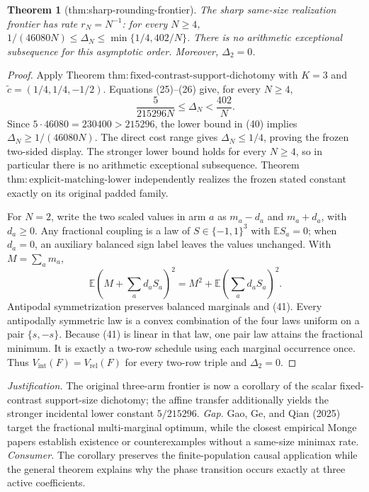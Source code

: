 \documentclass{article}
\newtheorem{theorem}{Theorem}
\begin{document}
\begin{theorem}[thm:sharp-rounding-frontier]\label{thm:sharp-rounding-frontier}
The sharp same-size realization frontier has rate \(r_N=N^{-1}\): for every \(N\ge4\), \(1/(46080N)\le\Delta_N\le\min\{1/4,402/N\}\).  There is no arithmetic exceptional subsequence for this asymptotic order.  Moreover, \(\Delta_2=0\).
\end{theorem}
\begin{proof}
Apply Theorem \(\mathrm{thm{:}fixed\mbox{-}contrast\mbox{-}support\mbox{-}dichotomy}\) with \(K=3\) and \(\widetilde c=(1/4,1/4,-1/2)\).  Equations (25)--(26) give, for every \(N\ge4\),
\[
 \frac{5}{215296N}\le\Delta_N<\frac{402}{N}. \tag{40}
\]
Since \(5\cdot46080=230400>215296\), the lower bound in (40) implies \(\Delta_N\ge1/(46080N)\).  The direct cost range gives \(\Delta_N\le1/4\), proving the frozen two-sided display.  The stronger lower bound holds for every \(N\ge4\), so in particular there is no arithmetic exceptional subsequence.  Theorem \(\mathrm{thm{:}explicit\mbox{-}matching\mbox{-}lower}\) independently realizes the frozen stated constant exactly on its original padded family.

For \(N=2\), write the two scaled values in arm \(a\) as \(m_a-d_a\) and \(m_a+d_a\), with \(d_a\ge0\).  Any fractional coupling is a law of \(S\in\{-1,1\}^3\) with \(\mathbb ES_a=0\); when \(d_a=0\), an auxiliary balanced sign label leaves the values unchanged.  With \(M=\sum_am_a\),
\[
 \mathbb E\left(M+\sum_ad_aS_a\right)^2
 =M^2+\mathbb E\left(\sum_ad_aS_a\right)^2. \tag{41}
\]
Antipodal symmetrization preserves balanced marginals and (41).  Every antipodally symmetric law is a convex combination of the four laws uniform on a pair \(\{s,-s\}\).  Because (41) is linear in that law, one pair law attains the fractional minimum.  It is exactly a two-row schedule using each marginal occurrence once.  Thus \(V_{\mathrm{int}}(F)=V_{\mathrm{rel}}(F)\) for every two-row triple and \(\Delta_2=0\).
\end{proof}
\par\smallskip\noindent \textit{Justification.} The original three-arm frontier is now a corollary of the scalar fixed-contrast support-size dichotomy; the affine transfer additionally yields the stronger incidental lower constant \(5/215296\). \textit{Gap.} Gao, Ge, and Qian (2025) target the fractional multi-marginal optimum, while the closest empirical Monge papers establish existence or counterexamples without a same-size minimax rate. \textit{Consumer.} The corollary preserves the finite-population causal application while the general theorem explains why the phase transition occurs exactly at three active coefficients.
\end{document}
